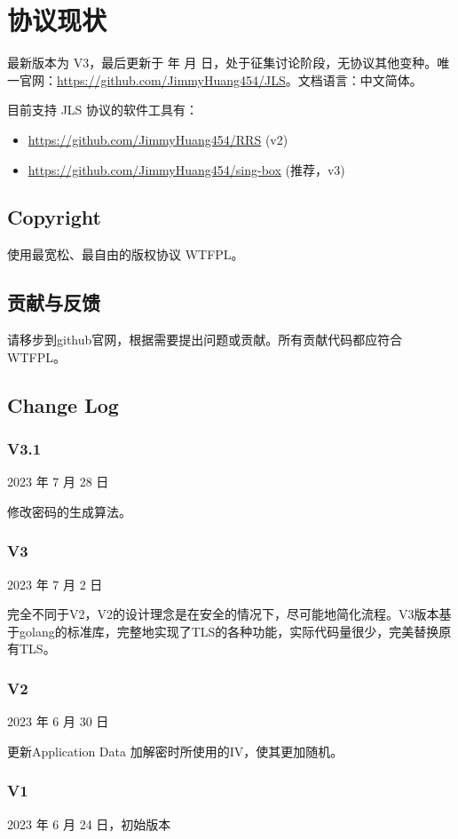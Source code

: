 \renewcommand{\today}{\number\year 年 \number\month 月 \number\day 日}

\chapter{协议现状}

最新版本为 V3，最后更新于 \today，处于征集讨论阶段，无协议其他变种。唯一官网：\href{https://github.com/JimmyHuang454/JLS}{https://github.com/JimmyHuang454/JLS}。文档语言：中文简体。

目前支持 JLS 协议的软件工具有：
\begin{itemize}
	\item \href{https://github.com/JimmyHuang454/RRS}{https://github.com/JimmyHuang454/RRS} (v2)
	\item \href{https://github.com/JimmyHuang454/RRS}{https://github.com/JimmyHuang454/sing-box} (推荐，v3)
\end{itemize}



\section{Copyright}
使用最宽松、最自由的版权协议 WTFPL。

\section{贡献与反馈}
请移步到github官网，根据需要提出问题或贡献。所有贡献代码都应符合 WTFPL。

\section{Change Log}
\subsection{V3.1}
2023 年 7 月 28 日

修改密码的生成算法。

\subsection{V3}
2023 年 7 月 2 日

完全不同于V2，V2的设计理念是在安全的情况下，尽可能地简化流程。V3版本基于golang的标准库，完整地实现了TLS的各种功能，实际代码量很少，完美替换原有TLS。

\subsection{V2}
2023 年 6 月 30 日

更新Application Data 加解密时所使用的IV，使其更加随机。


\subsection{V1}
2023 年 6 月 24 日，初始版本
